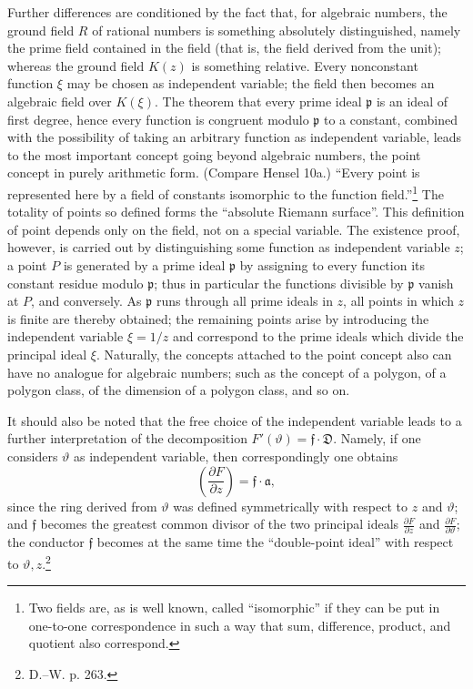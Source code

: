 \documentclass[11pt]{article}
\providecommand{\p}{\partial}
\providecommand{\frp}{\mathfrak p}
\providecommand{\fra}{\mathfrak a}
\providecommand{\frf}{\mathfrak f}
\providecommand{\frD}{\mathfrak D}
\begin{document}
Further differences are conditioned by the fact that, for algebraic numbers, the ground field \(R\) of rational numbers is something absolutely distinguished, namely the prime field contained in the field (that is, the field derived from the unit); whereas the ground field \(K(z)\) is something relative. Every nonconstant function \(\xi\) may be chosen as independent variable; the field then becomes an algebraic field over \(K(\xi)\). The theorem that every prime ideal \(\frp\) is an ideal of first degree, hence every function is congruent modulo \(\frp\) to a constant, combined with the possibility of taking an arbitrary function as independent variable, leads to the most important concept going beyond algebraic numbers, the point concept in purely arithmetic form. (Compare Hensel 10a.) ``Every point is represented here by a field of constants isomorphic to the function field.''\footnote{Two fields are, as is well known, called ``isomorphic'' if they can be put in one-to-one correspondence in such a way that sum, difference, product, and quotient also correspond.} The totality of points so defined forms the ``absolute Riemann surface''. This definition of point depends only on the field, not on a special variable. The existence proof, however, is carried out by distinguishing some function as independent variable \(z\); a point \(P\) is generated by a prime ideal \(\frp\) by assigning to every function its constant residue modulo \(\frp\); thus in particular the functions divisible by \(\frp\) vanish at \(P\), and conversely. As \(\frp\) runs through all prime ideals in \(z\), all points in which \(z\) is finite are thereby obtained; the remaining points arise by introducing the independent variable \(\xi=1/z\) and correspond to the prime ideals which divide the principal ideal \(\xi\). Naturally, the concepts attached to the point concept also can have no analogue for algebraic numbers; such as the concept of a polygon, of a polygon class, of the dimension of a polygon class, and so on.


It should also be noted that the free choice of the independent variable leads to a further interpretation of the decomposition \(F'(\vartheta)=\frf\cdot\frD\). Namely, if one considers \(\vartheta\) as independent variable, then correspondingly one obtains
\[
\left(\frac{\p F}{\p z}\right)=\frf\cdot\fra,
\]
since the ring derived from \(\vartheta\) was defined symmetrically with respect to \(z\) and \(\vartheta\); and \(\frf\) becomes the greatest common divisor of the two principal ideals \(\frac{\p F}{\p z}\) and \(\frac{\p F}{\p\vartheta}\); the conductor \(\frf\) becomes at the same time the ``double-point ideal'' with respect to \(\vartheta,z\).\footnote{D.--W. p. 263.}
\end{document}

